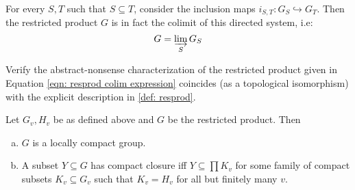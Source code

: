 \documentclass[11pt, x11names, openany]{book}
\newcommand{\inj}{\hookrightarrow}
\newcommand{\dlim}{\varinjlim}
\begin{document}
For every $S, T$ such that $S \subseteq T$, consider the inclusion maps $i_{S, T}: G_S \inj G_T$. Then the restricted product $G$ is in fact the colimit of this directed system, i.e:
\begin{equation}
\label{eqn: resprod colim expression}
    G = \dlim_{S} G_S 
\end{equation}

\begin{exercise}
\label{exercise: restricted product as colimit}
Verify the abstract-nonsense characterization of the restricted product given in Equation \ref{eqn: resprod colim expression} coincides (as a topological isomorphism) with the explicit description in \ref{def: resprod}.
\end{exercise}

\begin{prop}
\label{restricted product properties}
Let $G_v, H_v$ be as defined above and $G$ be the restricted product. Then
\begin{enumerate}[(a)]
    \item $G$ is a locally compact group.
    \item A subset $Y \subseteq G$ has compact closure iff $Y \subseteq \prod K_v$ for some family of compact subsets $K_v \subseteq G_v$ such that $K_v = H_v$ for all but finitely many $v$.
\end{enumerate}
\end{prop}
\end{document}
